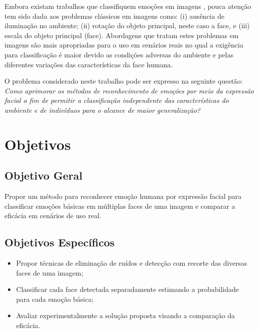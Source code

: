 Embora existam trabalhos que classifiquem emoções em imagens \citep{kim2016fusing, yu2016customized,barsoum2016training}, pouca atenção tem sido dada aos problemas clássicos em imagens como: (i) ausência de iluminação no ambiente; (ii) rotação do objeto principal, neste caso a face, e (iii) escala do objeto principal (face). Abordagens que tratam estes problemas em imagens são mais apropriadas para o uso em cenários reais no qual a exigência  para classificação é maior devido as condições adversas do ambiente e pelas diferentes variações das características da face humana. 

O problema considerado neste trabalho pode ser expresso na seguinte questão: \textit{Como aprimorar os métodos de reconhecimento de emoções por meio da expressão facial a fim de permitir a classificação independente das características do ambiente e de indivíduos para o alcance de maior generalização?} 

\section{Objetivos}

\subsection{Objetivo Geral}
Propor um método para reconhecer emoção humana por expressão facial para classificar emoções básicas em múltiplas faces de uma imagem e comparar a eficácia em cenários de uso real.

\subsection{Objetivos Específicos}
\begin{itemize}
 \item Propor técnicas de eliminação de ruídos e detecção com recorte das diversas faces de uma imagem;
 \item Classificar cada face detectada separadamente estimando a probabilidade para cada emoção básica;
 \item Avaliar experimentalmente a solução proposta visando a comparação da eficácia.
\end{itemize}

